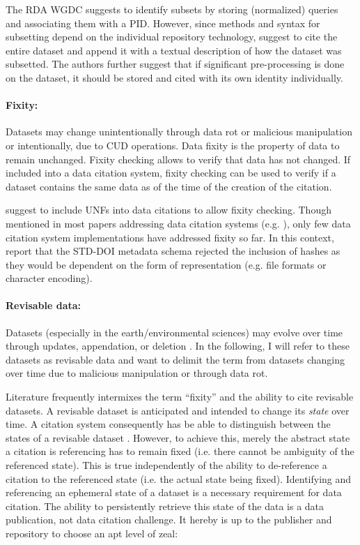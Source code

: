 \documentclass[a4paper,10pt]{article}
\begin{document}
The \gls{RDA} \gls{WGDC} \citep{Rauber2015a, Rauber2015, Proll2013} suggests to identify subsets by storing (normalized) queries and associating them with a \gls{PID}. However, since methods and syntax for subsetting depend on the individual repository technology, \cite{AltKin07} suggest to cite the entire dataset and append it with a textual description of how the dataset was subsetted. The authors further suggest that if significant pre-processing is done on the dataset, it should be stored and cited with its own identity individually. 

\paragraph{Fixity:}
Datasets may change unintentionally through data rot or malicious manipulation or intentionally, due to \gls{CUD} operations. 
Data fixity is the property of data to remain unchanged. 
Fixity checking allows to verify that data has not changed.
If included into a data citation system, fixity checking can be used to verify if a dataset contains the same data as of the time of the creation of the citation.

\cite{AltKin07, Rauber2015} suggest to include \glspl{UNF} into data citations to allow fixity checking. Though mentioned in most papers addressing data citation systems (e.g. \citep{Buneman2016, Davidson2017}), only few data citation system implementations have addressed fixity so far. In this context, \cite{Klump2016} report that the STD-DOI metadata schema rejected the inclusion of hashes as they would be dependent on the form of representation (e.g. file formats or character encoding).

\paragraph{Revisable data:}
Datasets (especially in the earth/environmental sciences) may evolve over time through updates, appendation, or deletion \citep{Klump2016}. In the following, I will refer to these datasets as revisable data and want to delimit the term from datasets changing over time due to malicious manipulation or through data rot.

Literature frequently intermixes the term ``fixity'' and the ability to cite revisable datasets. A revisable dataset is anticipated and intended to change its \textit{state} over time. A citation system consequently has be able to distinguish between the states of a revisable dataset \citep{Rauber2015, Klump2016}. However, to achieve this, merely the abstract state a citation is referencing has to remain fixed (i.e. there cannot be ambiguity of the referenced state).
This is true independently of the ability to de-reference a citation to the referenced state (i.e. the actual state being fixed). Identifying and referencing an ephemeral state of a dataset is a necessary requirement for data citation. The ability to persistently retrieve this state of the data is a data publication, not data citation challenge. It hereby is up to the publisher and repository to choose an apt level of zeal:
\end{document}
